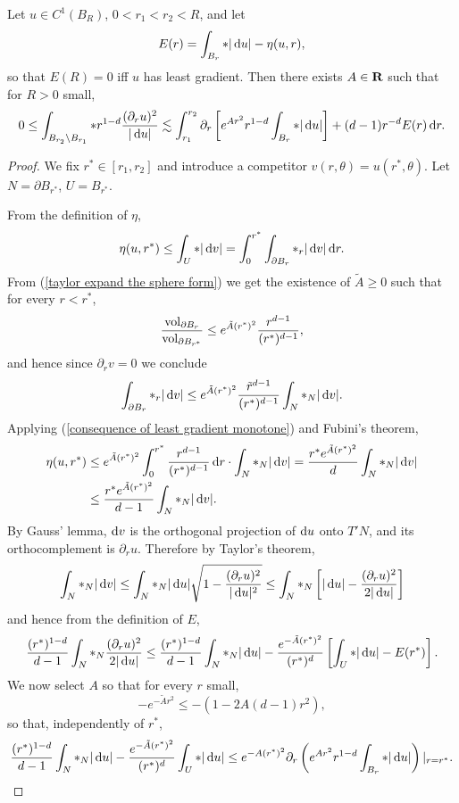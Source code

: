 \begin{lemma}\label{monotonicity lemma}
Let $u \in C^1(B_R)$, $0 < r_1 < r_2 < R$, and let
$$E(r) = \int_{B_r} *|\mathop{}\!\mathrm{d} u| - \eta(u, r),$$
so that $E(R) = 0$ iff $u$ has least gradient. Then there exists $A \in \mathbf{R}$ such that for $R > 0$ small,
\begin{equation}\label{monotonicity lemma eqn}0 \leq \int_{B_{r_2} \setminus B_{r_1}} *r^{1 - d}\frac{(\partial_ru)^2}{|\mathop{}\!\mathrm{d} u|} \lesssim \int_{r_1}^{r_2} \partial_r \left[e^{Ar^2} r^{1-d}\int_{B_r} *|\mathop{}\!\mathrm{d} u|\right] + (d - 1) r^{-d} E(r) \mathop{}\!\mathrm{d} r.\end{equation}
\end{lemma}
\begin{proof}
We fix $r^* \in [r_1, r_2]$ and introduce a competitor $v(r, \theta) = u(r^*, \theta)$.
Let $N = \partial B_{r^*}$, $U = B_{r^*}$.

From the definition of $\eta$,
\begin{equation}\label{consequence of least gradient monotone}
    \eta(u, r^*) \leq \int_U *|\mathop{}\!\mathrm{d} v| = \int_0^{r^*} \int_{\partial B_r} *_r |\mathop{}\!\mathrm{d} v| \mathop{}\!\mathrm{d} r.
\end{equation}
From (\ref{taylor expand the sphere form}) we get the existence of $\tilde A \geq 0$ such that for every $r < r^*$,
$$\frac{\mathrm{vol}_{\partial B_r}}{\mathrm{vol}_{\partial B_{r^*}}} \leq e^{\tilde A (r^*)^2} \frac{r^{d - 1}}{(r^*)^{d - 1}},$$
and hence since $\partial_r v = 0$ we conclude
$$\int_{\partial B_r} *_r |\mathop{}\!\mathrm{d} v| \leq e^{\tilde A(r^*)^2} \frac{\tilde r^{d - 1}}{(r^*)^{d - 1}} \int_N *_N |\mathop{}\!\mathrm{d} v|.$$
Applying (\ref{consequence of least gradient monotone}) and Fubini's theorem,
\begin{align*}
\eta(u, r^*) &\leq  e^{\tilde A(r^*)^2} \int_0^{r^*} \frac{r^{d - 1}}{(r^*)^{d - 1}} \mathop{}\!\mathrm{d} r \cdot \int_N *_N |\mathop{}\!\mathrm{d} v| = \frac{r^* e^{\tilde A(r^*)^2}}{d} \int_N *_N |\mathop{}\!\mathrm{d} v|\\
&\leq \frac{r^* e^{\tilde A(r^*)^2}}{d - 1} \int_N *_N |\mathop{}\!\mathrm{d} v|.
\end{align*}
By Gauss' lemma, $\mathop{}\!\mathrm{d} v$ is the orthogonal projection of $\mathop{}\!\mathrm{d} u$ onto $T'N$, and its orthocomplement is $\partial_r u$. Therefore by Taylor's theorem,
$$\int_N *_N |\mathop{}\!\mathrm{d} v| \leq \int_N *_N |\mathop{}\!\mathrm{d} u| \sqrt{1 - \frac{(\partial_r u)^2}{|\mathop{}\!\mathrm{d} u|^2}} \leq \int_N *_N \left[|\mathop{}\!\mathrm{d} u| - \frac{(\partial_r u)^2}{2 |\mathop{}\!\mathrm{d} u|}\right]$$
and hence from the definition of $E$,
$$\frac{(r^*)^{1 - d}}{d - 1} \int_N *_N \frac{(\partial_r u)^2}{2|\mathop{}\!\mathrm{d} u|} \leq \frac{(r^*)^{1 - d}}{d - 1} \int_N *_N |\mathop{}\!\mathrm{d} u| - \frac{e^{-\tilde A(r^*)^2}}{(r^*)^d}\left[\int_U *|\mathop{}\!\mathrm{d} u| - E(r^*)\right].$$
We now select $A$ so that for every $r$ small,
$$-e^{-\tilde Ar^2} \leq -(1 - 2A(d - 1)r^2),$$
so that, independently of $r^*$,
$$\frac{(r^*)^{1 - d}}{d - 1} \int_N *_N |\mathop{}\!\mathrm{d} u| - \frac{e^{-\tilde A(r^*)^2}}{(r^*)^d} \int_U *|\mathop{}\!\mathrm{d} u| \leq e^{-A(r^*)^2} \partial_r\left(e^{Ar^2} r^{1 - d} \int_{B_r} *|\mathop{}\!\mathrm{d} u|\right)|_{r = r^*}.$$


\end{proof}

